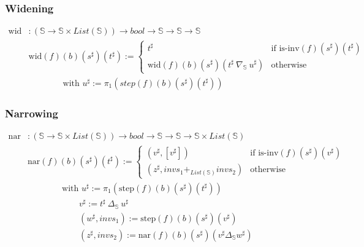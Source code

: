 \documentclass{beamer}
\begin{document}
        \begin{frame}
            \frametitle{Widening}
            \begin{align*}
                \text{wid} &: (\mathbb{S} \to \mathbb{S} \times List(\mathbb{S})) \to bool \to \mathbb{S} \to \mathbb{S} \to \mathbb{S} \\
                &\text{wid} (f) (b) (s^{\sharp}) (t^{\sharp}) := \begin{cases}
                                                                t^{\sharp} & \text{if } \text{is-inv} (f) (s^{\sharp}) (t^{\sharp}) \\
                                                                \text{wid} (f) (b) (s^{\sharp}) (t^{\sharp}\ \nabla_\mathbb{S}\ u^{\sharp}) & \text{otherwise}
                                                            \end{cases} \\
                & \qquad \qquad \text{with } u^{\sharp} := \pi_1 (step (f) (b) (s^{\sharp}) (t^{\sharp}))
            \end{align*}
            
        \end{frame}

        \begin{frame}
            \frametitle{Narrowing}
            \begin{align*}
                \text{nar} &: (\mathbb{S} \to \mathbb{S} \times List(\mathbb{S})) \to bool \to \mathbb{S} \to \mathbb{S} \to \mathbb{S} \times List(\mathbb{S}) \\
                &\text{nar} (f) (b) (s^{\sharp}) (t^{\sharp}) := \begin{cases}
                                                                (v^{\sharp}, [v^{\sharp}]) & \text{if } \text{is-inv} (f) (s^{\sharp}) (v^{\sharp}) \\
                                                                (z^{\sharp}, invs_1 +_{List(\mathbb{S})} invs_2) & \text{otherwise}
                                                                \end{cases} \\
                & \qquad \qquad \text{with } u^{\sharp} := \pi_1 (\text{step} (f) (b) (s^{\sharp}) (t^{\sharp})) \\ 
                & \qquad \qquad \qquad v^{\sharp} := t^{\sharp}\ \Delta_\mathbb{S}\ u^{\sharp} \\
                & \qquad \qquad \qquad (w^{\sharp}, invs_1) := \text{step} (f) (b) (s^{\sharp}) (v^{\sharp}) \\
                & \qquad \qquad \qquad (z^{\sharp}, invs_2) := \text{nar} (f) (b) (s^{\sharp}) (v^{\sharp} \Delta_\mathbb{S} w^{\sharp})
            \end{align*}
        
        \end{frame}
\end{document}
